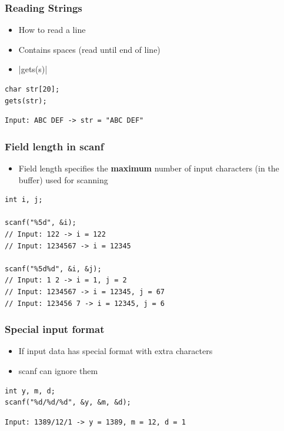 \documentclass{../c-lecture}
\begin{document}
\begin{frame}[fragile]
  \frametitle{Reading Strings}
  \begin{itemize}
    \item How to read a line
    \item Contains spaces (read until end of line)
    \item {}|gets(s)|
  \end{itemize}
  \begin{verbatim}
char str[20];
gets(str);
  \end{verbatim}
  \begin{verbatim}
Input: ABC DEF -> str = "ABC DEF"
  \end{verbatim}
\end{frame}

\begin{frame}[fragile]
  \frametitle{Field length in scanf}
  \begin{itemize}
    \item
      Field length specifies the \textbf{\color{Orange} maximum} number
      of input characters (in the buffer) used for scanning

  \end{itemize}
  \begin{verbatim}
int i, j;

scanf("%5d", &i);
// Input: 122 -> i = 122
// Input: 1234567 -> i = 12345

scanf("%5d%d", &i, &j);
// Input: 1 2 -> i = 1, j = 2
// Input: 1234567 -> i = 12345, j = 67
// Input: 123456 7 -> i = 12345, j = 6
  \end{verbatim}
\end{frame}

\begin{frame}[fragile]
  \frametitle{Special input format}
  \begin{itemize}
    \item If input data has special format with extra characters
    \item scanf can ignore them
  \end{itemize}
  \begin{verbatim}
int y, m, d;
scanf("%d/%d/%d", &y, &m, &d);
  \end{verbatim}
  \begin{verbatim}
Input: 1389/12/1 -> y = 1389, m = 12, d = 1
  \end{verbatim}
\end{frame}
\end{document}
